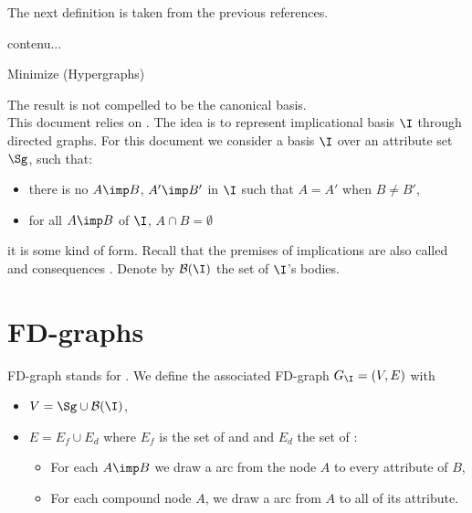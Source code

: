 The next definition is taken from the previous references.


\begin{definition}
	contenu...
\end{definition}



\begin{algorithm}[H]
	

	\caption{Minimize (Hypergraphs)}
\end{algorithm}

\vspace{1.2em}

The result is not compelled to be the canonical basis.
\\
This document relies on \cite{ausiello_graph_1983, ausiello_minimal_1986}. The 
idea is to represent
implicational basis $\I$ through directed graphs. For this document we consider 
a basis $\I$ over an attribute set $\Sg$, such that:

\begin{itemize}
	\item there is no $A \imp B$, $A' \imp B'$ in $\I$ such that $A = A'$ when
	$B \neq B'$,
	\item for all $A \imp B$ of $\I$, $A \cap B = \emptyset$
\end{itemize}

\noindent it is some kind of  form. Recall that the premises of
implications are also called  and consequences .
Denote by $\mathcal{B}(\I)$ the set of $\I$'s bodies. 

\newpage

\section{FD-graphs}

FD-graph stands for . We define the 
associated FD-graph $G_{\I} = (V, E)$ with 

\begin{itemize}
	\item $V = \Sg \cup \mathcal{B}(\I)$,
	\item $E = E_f \cup E_d$ where $E_f$ is the set of  and
	and $E_d$ the set of :
	\begin{itemize}
		\item For each $A \imp B$ we draw a  arc from the node
		$A$ to every attribute of $B$,
		\item For each compound node $A$, we draw a  arc from
		$A$ to all of its attribute.
	\end{itemize}
\end{itemize}


